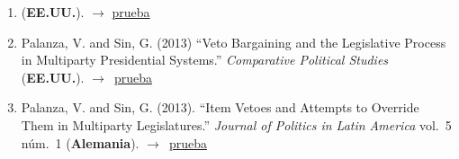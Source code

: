 \documentclass[12 pt, letter]{article}
\newenvironment{CitasMiTrabajo}{
    \begin{footnotesize}
    \begin{enumerate}[label={\footnotesize\emph{cita~\arabic*}},ref=\arabic*] %
        \setlength{\itemsep}{.1\itemsep}
        \setlength{\parskip}{.1\parskip}
    }{\end{enumerate}\end{footnotesize}}
\begin{document}
\begin{CitasMiTrabajo}
        \item {} (\textbf{EE.UU.}). $\rightarrow$ \href{https://github.com/emagar/cv/blob/master/citasMiTrab/BullyPulpits/pachon2008phd.pdf}{prueba}

        \item Palanza, V. and Sin, G. (2013) ``Veto Bargaining and the Legislative Process in Multiparty Presidential Systems.'' \emph{Comparative Political Studies} (\textbf{EE.UU.}). $\rightarrow$~\href{https://github.com/emagar/cv/blob/master/citasMiTrab/BullyPulpits/palanza.sin2013jpla.excerpts.pdf}{prueba}

        \item Palanza, V. and Sin, G. (2013). ``Item Vetoes and Attempts to Override Them in Multiparty Legislatures.'' \emph{Journal of Politics in Latin America} vol.~5 n\'um.~1 (\textbf{Alemania}). $\rightarrow$~\href{https://github.com/emagar/cv/blob/master/citasMiTrab/BullyPulpits/sin.palanza2014cps.excerpts.pdf}{prueba}

        \label{ncites:magar.2001} %





        \end{CitasMiTrabajo}
\end{document}
